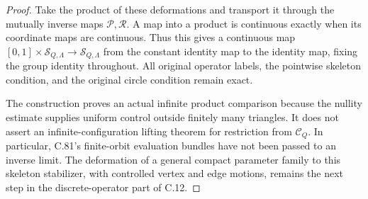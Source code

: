 \begin{proof}
Take the product of these deformations
and transport it through the mutually
inverse maps $\mathcal P,\mathcal R$.
A map into a product is continuous
exactly when its coordinate maps are
continuous. Thus this gives a continuous
map $[0,1]\times\mathscr S_{Q,\Lambda}
\to\mathscr S_{Q,\Lambda}$ from the
constant identity map to the identity
map, fixing the group identity throughout.
All original operator labels, the
pointwise skeleton condition, and the
original circle condition remain exact.

The construction proves an actual
infinite product comparison because
the nullity estimate supplies uniform
control outside finitely many triangles.
It does not assert an infinite-configuration
lifting theorem for restriction from
$\mathscr C_Q$. In particular, C.81's
finite-orbit evaluation bundles have
not been passed to an inverse limit.
The deformation of a general compact
parameter family to this skeleton
stabilizer, with controlled vertex and
edge motions, remains the next step
in the discrete-operator part of C.12.
\end{proof}
